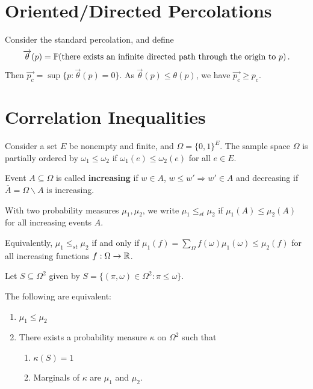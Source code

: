 \section{Oriented/Directed Percolations}
\label{sec:orient-perc}

Consider the standard percolation, and define
\begin{align}
  \label{eq:20}
  \overrightarrow{\theta}(p) = \Prob{\text{there exists an infinite
  directed path through the origin to $p$}}.
\end{align} Then $\overrightarrow{p_{c}} = \sup \{ p:
\overrightarrow{\theta}(p) = 0 \}$. As $\overrightarrow{\theta}(p)
\leq \theta(p)$, we have $\overrightarrow{p_{c}} \geq p_{c}$.


\section{Correlation Inequalities}
\label{sec:corr-ineq}

Consider a set $E$ be nonempty and finite, and $\Omega = \{ 0, 1
\}^{E}$.  The sample space $\Omega$ is partially ordered by
$\omega_{1} \leq \omega_{2}$ if $\omega_{1}(e) \leq \omega_{2}(e)$ for
all $e \in E$.

Event $A \subseteq \Omega$ is called \textbf{increasing} if $w \in A$,
$w \leq w' \Rightarrow w' \in A$ and decreasing if $\overline A =
\Omega \backslash A$ is increasing.

\begin{defn}
  \label{defn:random_walks_on_graphs:6}
  With two probability measures $\mu_{1}, \mu_{2}$, we write $\mu_{1}
  \leq_{st} \mu_{2}$ if $\mu_{1}(A) \leq \mu_{2}(A)$ for all
  increasing events $A$.

  Equivalently, $\mu_{1} \leq_{st} \mu_{2}$ if and only if $\mu_{1}(f)
  = \sum_{\Omega} f(\omega) \mu_{1}(\omega) \leq \mu_{2}(f)$ for all
  increasing functions $f: \Omega \rightarrow \mathbb{R}$.
\end{defn}

Let $S \subseteq \Omega^{2}$ given by $S = \{ (\pi, \omega) \in
\Omega^{2}: \pi \leq \omega \}$.

\begin{thm}[Strassen]
  \label{defn:random_walks_on_graphs:7}
  The following are equivalent:
  \begin{enumerate}
  \item $\mu_{1} \leq \mu_{2}$
  \item There exists a probability measure $\kappa$ on $\Omega^{2}$ such
    that
    \begin{enumerate}
    \item $\kappa(S) = 1$
    \item Marginals of $\kappa$ are $\mu_{1}$ and $\mu_{2}$.
    \end{enumerate}
  \end{enumerate}
\end{thm}

